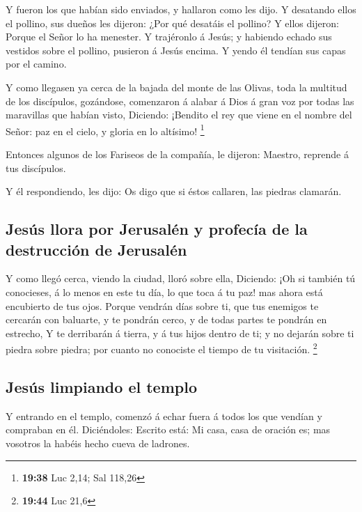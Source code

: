  Y fueron los que habían sido enviados, y hallaron como
les dijo.  Y desatando ellos el pollino, sus dueños les
dijeron: ¿Por qué desatáis el pollino?  Y ellos dijeron:
Porque el Señor lo ha menester.  Y trajéronlo á Jesús; y
habiendo echado sus vestidos sobre el pollino, pusieron á Jesús encima.
 Y yendo él tendían sus capas por el camino.

 Y como llegasen ya cerca de la bajada del monte de las
Olivas, toda la multitud de los discípulos, gozándose, comenzaron á
alabar á Dios á gran voz por todas las maravillas que habían visto,
 Diciendo: ¡Bendito el rey que viene en el nombre del
Señor: paz en el cielo, y gloria en lo altísimo! \footnote{\textbf{19:38}
  Luc 2,14; Sal 118,26}

 Entonces algunos de los Fariseos de la compañía, le
dijeron: Maestro, reprende á tus discípulos.

 Y él respondiendo, les dijo: Os digo que si éstos
callaren, las piedras clamarán.

\hypertarget{jesuxfas-llora-por-jerusaluxe9n-y-profecuxeda-de-la-destrucciuxf3n-de-jerusaluxe9n}{%
\subsection{Jesús llora por Jerusalén y profecía de la destrucción de
Jerusalén}\label{jesuxfas-llora-por-jerusaluxe9n-y-profecuxeda-de-la-destrucciuxf3n-de-jerusaluxe9n}}

 Y como llegó cerca, viendo la ciudad, lloró sobre ella,
 Diciendo: ¡Oh si también tú conocieses, á lo menos en
este tu día, lo que toca á tu paz! mas ahora está encubierto de tus
ojos.  Porque vendrán días sobre ti, que tus enemigos te
cercarán con baluarte, y te pondrán cerco, y de todas partes te pondrán
en estrecho,  Y te derribarán á tierra, y á tus hijos
dentro de ti; y no dejarán sobre ti piedra sobre piedra; por cuanto no
conociste el tiempo de tu visitación. \footnote{\textbf{19:44} Luc 21,6}

\hypertarget{jesuxfas-limpiando-el-templo}{%
\subsection{Jesús limpiando el
templo}\label{jesuxfas-limpiando-el-templo}}

 Y entrando en el templo, comenzó á echar fuera á todos
los que vendían y compraban en él.  Diciéndoles: Escrito
está: Mi casa, casa de oración es; mas vosotros la habéis hecho cueva de
ladrones.

